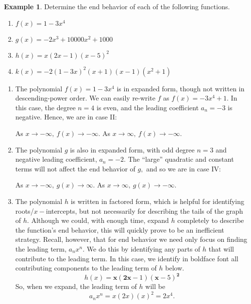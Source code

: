 \documentclass[12pt]{book}
\theoremstyle{definition}
\newtheorem{example}{Example}
\begin{document}
\begin{example}
Determine the end behavior of each of the following functions.
\begin{multicols}{2}
\begin{enumerate}
	\item $f(x)=1-3x^4$
	\item $g(x)=-2x^3+10000x^2+1000$
	\item $h(x)=x(2x-1)(x-5)^2$
	\item $k(x)=-2(1-3x)^2(x+1)(x-1)(x^2+1)$
\end{enumerate}
\end{multicols}
\begin{enumerate}
\item The polynomial $f(x)=1-3x^4$ is in expanded form, though not written in descending-power order.  We can easily re-write $f$ as $f(x)=-3x^4+1$.  In this case, the degree $n=4$ is even, and the leading coefficient $a_n=-3$ is negative.  Hence, we are in case II:
\begin{center}
As $x\rightarrow -\infty, \ f(x)\rightarrow -\infty.$ \hspace{1in} As $x\rightarrow \infty, \ f(x)\rightarrow -\infty.$
\end{center}
\item The polynomial $g$ is also in expanded form, with odd degree $n=3$ and negative leading coefficient, $a_n=-2$.  The ``large'' quadratic and  constant terms will not affect the end behavior of $g,$ and so we are in case IV:
\begin{center}
As $x\rightarrow -\infty, \ g(x)\rightarrow \infty.$ \hspace{1in} As $x\rightarrow \infty, \ g(x)\rightarrow -\infty.$
\end{center}
\item The polynomial $h$ is written in factored form, which is helpful for identifying roots/$x-$intercepts, but not necessarily for describing the tails of the graph of $h$.  Although we could, with enough time, expand $h$ completely to describe the function's end behavior, this will quickly prove to be an inefficient strategy.  Recall, however, that for end behavior we need only focus on finding the leading term, $a_nx^n$.  We do this by identifying any parts of $h$ that will contribute to the leading term.  In this case, we identify in boldface font all contributing components to the leading term of $h$ below.
$$h(x)=\mathbf{x}(\mathbf{2x}-1)(\mathbf{x}-5)^{\mathbf{2}}$$
So, when we expand, the leading term of $h$ will be
$$a_nx^n=x(2x)(x)^2=2x^4.$$

\end{enumerate}
\end{example}
\end{document}
